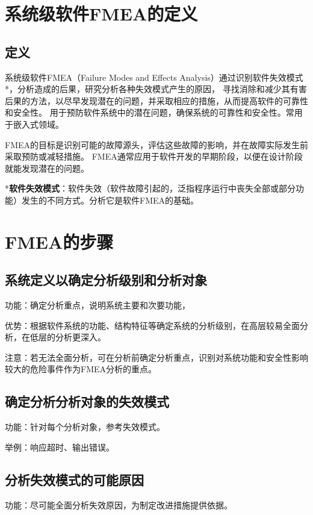 \section{系统级软件FMEA的定义}

\subsection{定义}
系统级软件FMEA（Failure Modes and Effects Analysis）通过识别软件失效模式*，分析造成的后果，研究分析各种失效模式产生的原因，
寻找消除和减少其有害后果的方法，以尽早发现潜在的问题，并采取相应的措施，从而提高软件的可靠性和安全性。
用于预防软件系统中的潜在问题，确保系统的可靠性和安全性。常用于嵌入式领域。

FMEA的目标是识别可能的故障源头，评估这些故障的影响，并在故障实际发生前采取预防或减轻措施。
FMEA通常应用于软件开发的早期阶段，以便在设计阶段就能发现潜在的问题。

*\textbf{软件失效模式}：软件失效（软件故障引起的，泛指程序运行中丧失全部或部分功能）发生的不同方式。分析它是软件FMEA的基础。

\section{FMEA的步骤}

\subsection{系统定义以确定分析级别和分析对象}

功能：确定分析重点，说明系统主要和次要功能，

优势：根据软件系统的功能、结构特征等确定系统的分析级别，在高层较易全面分析，在低层的分析更深入。

注意：若无法全面分析，可在分析前确定分析重点，识别对系统功能和安全性影响较大的危险事件作为FMEA分析的重点。

\subsection{确定分析分析对象的失效模式}

功能：针对每个分析对象，参考失效模式。

举例：响应超时、输出错误。

\subsection{分析失效模式的可能原因}

功能：尽可能全面分析失效原因，为制定改进措施提供依据。

